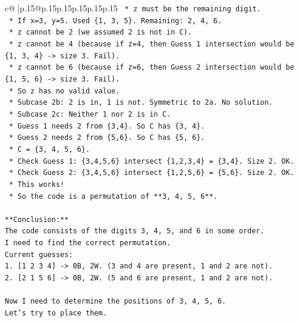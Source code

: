 \documentclass{article}
\begin{document}
{\begin{supertabular}{c@{$\;$}|p{.15\linewidth}@{}p{.15\linewidth}p{.15\linewidth}p{.15\linewidth}p{.15\linewidth}p{.15\linewidth}}
{{{\texttt{                *   z must be the remaining digit.} \\
\texttt{                *   If x=3, y=5. Used \{1, 3, 5\}. Remaining: 2, 4, 6.} \\
\texttt{                *   z cannot be 2 (we assumed 2 is not in C).} \\
\texttt{                *   z cannot be 4 (because if z=4, then Guess 1 intersection would be \{1, 3, 4\} {-}> size 3. Fail).} \\
\texttt{                *   z cannot be 6 (because if z=6, then Guess 2 intersection would be \{1, 5, 6\} {-}> size 3. Fail).} \\
\texttt{                *   So z has no valid value.} \\
\texttt{        *   Subcase 2b: 2 is in, 1 is not. Symmetric to 2a. No solution.} \\
\texttt{        *   Subcase 2c: Neither 1 nor 2 is in C.} \\
\texttt{            *   Guess 1 needs 2 from \{3,4\}. So C has \{3, 4\}.} \\
\texttt{            *   Guess 2 needs 2 from \{5,6\}. So C has \{5, 6\}.} \\
\texttt{            *   C = \{3, 4, 5, 6\}.} \\
\texttt{            *   Check Guess 1: \{3,4,5,6\} intersect \{1,2,3,4\} = \{3,4\}. Size 2. OK.} \\
\texttt{            *   Check Guess 2: \{3,4,5,6\} intersect \{1,2,5,6\} = \{5,6\}. Size 2. OK.} \\
\texttt{            *   This works!} \\
\texttt{            *   So the code is a permutation of **3, 4, 5, 6**.} \\
\\ 
\texttt{**Conclusion:**} \\
\texttt{The code consists of the digits 3, 4, 5, and 6 in some order.} \\
\texttt{I need to find the correct permutation.} \\
\texttt{Current guesses:} \\
\texttt{1. {[}1 2 3 4{]} {-}> 0B, 2W. (3 and 4 are present, 1 and 2 are not).} \\
\texttt{2. {[}2 1 5 6{]} {-}> 0B, 2W. (5 and 6 are present, 1 and 2 are not).} \\
\\ 
\texttt{Now I need to determine the positions of 3, 4, 5, 6.} \\
\texttt{Let's try to place them.} \\
}}}
\end{supertabular}}
\end{document}
